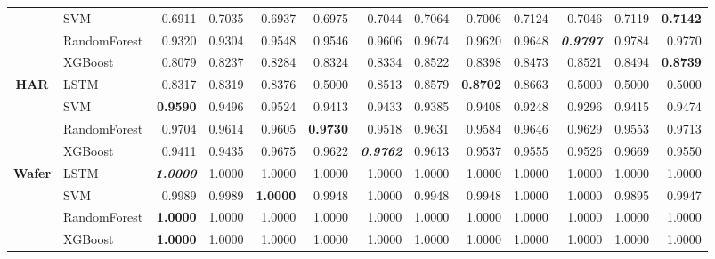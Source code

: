 \begin{table}[H]
\begin{adjustbox}{max width=14cm}
\begin{tabular}{|c|l|r|r|r|r|r|r|r|r|r|r|r|}
			                      & SVM          & 0.6911          & 0.7035 & 0.6937 & 0.6975          & 0.7044          & 0.7064          & 0.7006 & 0.7124 & 0.7046          & 0.7119 & \textbf{0.7142}          \\
			                      & RandomForest & 0.9320          & 0.9304 & 0.9548 & 0.9546          & 0.9606          & 0.9674          & 0.9620 & 0.9648 & \textit{\textbf{0.9797}} & 0.9784 & 0.9770          \\
			                      & XGBoost      & 0.8079          & 0.8237 & 0.8284 & 0.8324          & 0.8334          & 0.8522          & 0.8398 & 0.8473 & 0.8521          & 0.8494 & \textbf{0.8739}          \\
			\hline
			\textbf{HAR}          & LSTM         & 0.8317          & 0.8319 & 0.8376 & 0.5000          & 0.8513          & 0.8579          & \textbf{0.8702} & 0.8663 & 0.5000          & 0.5000 & 0.5000          \\
			                      & SVM          & \textbf{0.9590}          & 0.9496 & 0.9524 & 0.9413          & 0.9433          & 0.9385          & 0.9408 & 0.9248 & 0.9296          & 0.9415 & 0.9474          \\
			                      & RandomForest & 0.9704          & 0.9614 & 0.9605 & \textbf{0.9730} & 0.9518          & 0.9631          & 0.9584 & 0.9646 & 0.9629          & 0.9553 & 0.9713          \\
			                      & XGBoost      & 0.9411          & 0.9435 & 0.9675 & 0.9622          & \textit{\textbf{0.9762}}          & 0.9613          & 0.9537 & 0.9555 & 0.9526          & 0.9669 & 0.9550          \\
			\hline
			\textbf{Wafer}        & LSTM         & \textit{\textbf{1.0000}} & 1.0000 & 1.0000 & 1.0000          & 1.0000          & 1.0000          & 1.0000 & 1.0000 & 1.0000          & 1.0000 & 1.0000          \\
			                      & SVM          & 0.9989          & 0.9989 & \textbf{1.0000} & 0.9948          & 1.0000          & 0.9948          & 0.9948 & 1.0000 & 1.0000          & 0.9895 & 0.9947          \\
			                      & RandomForest & \textbf{1.0000}          & 1.0000 & 1.0000 & 1.0000          & 1.0000          & 1.0000          & 1.0000 & 1.0000 & 1.0000          & 1.0000 & 1.0000          \\
			                      & XGBoost      & \textbf{1.0000}          & 1.0000 & 1.0000 & 1.0000          & 1.0000          & 1.0000          & 1.0000 & 1.0000 & 1.0000          & 1.0000 & 1.0000          \\

\end{tabular}
\end{adjustbox}
\end{table}
